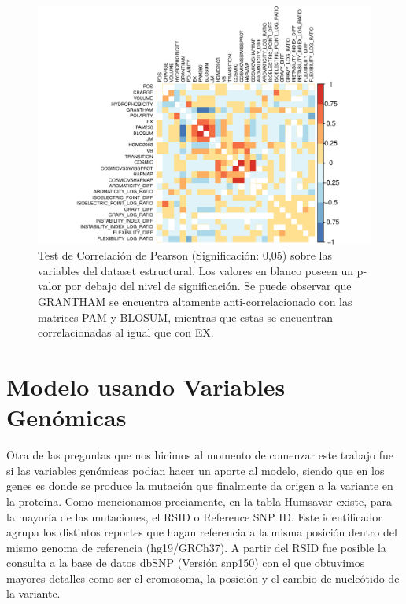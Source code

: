 \begin{figure}[H]
    \centering
    \includegraphics[scale=0.8]{documents/latex/figures/3/corrplot_1.pdf}
    \caption{Test de Correlación de Pearson (Significación: 0,05) sobre las variables del dataset estructural. Los valores en blanco poseen un p-valor por debajo del nivel de significación. Se puede observar que GRANTHAM se encuentra altamente anti-correlacionado con las matrices PAM y BLOSUM, mientras que estas se encuentran correlacionadas al igual que con EX.}
    \label{fig:corrplot_1}
\end{figure}

\section{Modelo usando Variables Genómicas}

Otra de las preguntas que nos hicimos al momento de comenzar este trabajo fue si las variables genómicas podían hacer un aporte al modelo, siendo que en los genes es donde se produce la mutación que finalmente da origen a la variante en la proteína. Como mencionamos preciamente, en la tabla Humsavar existe, para la mayoría de las mutaciones, el RSID o Reference SNP ID. Este identificador agrupa los distintos reportes que hagan referencia a la misma posición dentro del mismo genoma de referencia (hg19/GRCh37). A partir del RSID fue posible la consulta a la base de datos dbSNP (Versión snp150) con el que obtuvimos mayores detalles como ser el cromosoma, la posición y el cambio de nucleótido de la variante. 

